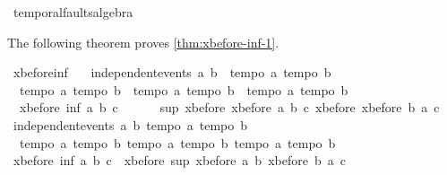 \begin{isabellebody}
\begin{isamarkuptext}
\end{isamarkuptext}\isamarkuptrue%
\isamarkupfalse%
\ temporal{\isacharunderscore}faults{\isacharunderscore}algebra\isanewline
{}%
\begin{isamarkuptext}%
The following theorem proves \cref{thm:xbefore-inf-1}.%
\end{isamarkuptext}\isamarkuptrue%
\isamarkupfalse%
\ xbefore{\isacharunderscore}inf{\isacharunderscore}{}{\isacharcolon}\ \isanewline
\ \ {\isachardoublequoteopen}independent{\isacharunderscore}events\ a\ b\ {\isasymLongrightarrow}\ {\isasymlbrakk}tempo{}\ a{\isacharsemicolon}\ tempo{}\ b{\isasymrbrakk}\ {\isasymLongrightarrow}\ \isanewline
\ \ {\isasymlbrakk}tempo{}\ a{\isacharsemicolon}\ tempo{}\ b{\isasymrbrakk}\ {\isasymLongrightarrow}\ {\isasymlbrakk}tempo{}\ a{\isacharsemicolon}\ tempo{}\ b{\isasymrbrakk}\ {\isasymLongrightarrow}\ {\isasymlbrakk}tempo{}\ a{\isacharsemicolon}\ tempo{}\ b{\isasymrbrakk}\ {\isasymLongrightarrow}\ \isanewline
\ \ xbefore\ {\isacharparenleft}inf\ a\ b{\isacharparenright}\ c\ {\isacharequal}\ \isanewline
\ \ \ \ sup\ {\isacharparenleft}xbefore\ {\isacharparenleft}xbefore\ a\ b{\isacharparenright}\ c{\isacharparenright}\ {\isacharparenleft}xbefore\ {\isacharparenleft}xbefore\ b\ a{\isacharparenright}\ c{\isacharparenright}{\isachardoublequoteclose}\isanewline
%
\isadelimproof
%
\endisadelimproof
%
\isatagproof
{}\isamarkupfalse%
{\isacharminus}\isanewline
\ \ \isamarkupfalse%
\ {\isachardoublequoteopen}independent{\isacharunderscore}events\ a\ b{\isachardoublequoteclose}\ {\isachardoublequoteopen}tempo{}\ a{\isachardoublequoteclose}\ {\isachardoublequoteopen}tempo{}\ b{\isachardoublequoteclose}\ \isanewline
\ \ {\isachardoublequoteopen}tempo{}\ a{\isachardoublequoteclose}\ {\isachardoublequoteopen}tempo{}\ b{\isachardoublequoteclose}\ {\isachardoublequoteopen}tempo{}\ a{\isachardoublequoteclose}\ {\isachardoublequoteopen}tempo{}\ b{\isachardoublequoteclose}\ {\isachardoublequoteopen}tempo{}\ a{\isachardoublequoteclose}\ {\isachardoublequoteopen}tempo{}\ b{\isachardoublequoteclose}\isanewline
\ \ \isamarkupfalse%
\ {\isachardoublequoteopen}xbefore\ {\isacharparenleft}inf\ a\ b{\isacharparenright}\ c\ {\isacharequal}\ xbefore\ {\isacharparenleft}sup\ {\isacharparenleft}xbefore\ a\ b{\isacharparenright}\ {\isacharparenleft}xbefore\ b\ a{\isacharparenright}{\isacharparenright}\ c{\isachardoublequoteclose}\isanewline

\end{isabellebody}
